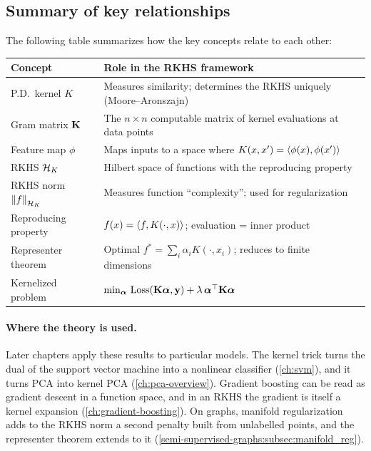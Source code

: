 \begin{notechapter}
\section{Summary of key relationships}
\label{rkhs:sec:summary}

The following table summarizes how the key concepts relate to each other:

\begin{center}
\renewcommand{\arraystretch}{1.4}
\begin{tabular}{@{}p{4cm}p{9.5cm}@{}}
\toprule
Concept & Role in the RKHS framework \\
\midrule
P.D.\ kernel $K$ & Measures similarity; determines the RKHS uniquely
(Moore--Aronszajn) \\
Gram matrix $\mathbf{K}$ & The $n \times n$ computable matrix of kernel
evaluations at data points \\
Feature map $\phi$ & Maps inputs to a space where $K(x,x') =
\left\langle \phi(x), \phi(x') \right\rangle$ \\
RKHS $\mathcal{H}_K$ & Hilbert space of functions with the reproducing property \\
RKHS norm $\left\|f\right\|_{\mathcal{H}_K}$ & Measures function ``complexity''; used for
regularization \\
Reproducing property & $f(x) = \left\langle f, K(\cdot,x) \right\rangle$; evaluation =
inner product \\
Representer theorem & Optimal $f^* = \sum_i \alpha_i K(\cdot, x_i)$;
reduces to finite dimensions \\
Kernelized problem & $\min_{\boldsymbol{\alpha}}
\,\mathrm{Loss}(\mathbf{K}\boldsymbol{\alpha}, \mathbf{y}) +
\lambda\,\boldsymbol{\alpha}^\top\mathbf{K}\boldsymbol{\alpha}$ \\
\bottomrule
\end{tabular}
\end{center}

\paragraph{Where the theory is used.} Later chapters apply these results to particular models. The kernel trick turns the dual of the support vector machine into a nonlinear classifier (\cref{ch:svm}), and it turns PCA into kernel PCA (\cref{ch:pca-overview}). Gradient boosting can be read as gradient descent in a function space, and in an RKHS the gradient is itself a kernel expansion (\cref{ch:gradient-boosting}). On graphs, manifold regularization adds to the RKHS norm a second penalty built from unlabelled points, and the representer theorem extends to it (\cref{semi-supervised-graphs:subsec:manifold_reg}).


\end{notechapter}
